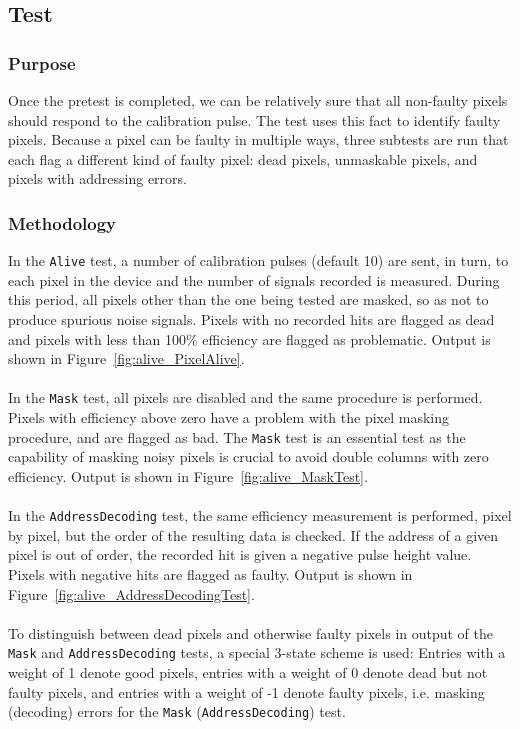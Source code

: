 
\newpage

\subsection{\alivetest Test}
\label{ss:alive}

\subsubsection{Purpose}

Once the pretest is completed, we can be relatively sure that all non-faulty pixels should respond to the calibration pulse.
The \alivetest test uses this fact to identify faulty pixels.
Because a pixel can be faulty in multiple ways, three subtests are run that each flag a different kind of faulty pixel:
dead pixels, unmaskable pixels, and pixels with addressing errors.

\subsubsection{Methodology}

In the {\tt Alive} test, a number of calibration pulses (default 10) are sent, in turn,
to each pixel in the device and the number of signals recorded is measured.
During this period, all pixels other than the one being tested are masked, so as not to produce spurious noise signals.
Pixels with no recorded hits are flagged as dead and pixels with less than 100\% efficiency are flagged as problematic.
Output is shown in Figure~\ref{fig:alive_PixelAlive}.
\\\\
In the {\tt Mask} test, all pixels are disabled and the same procedure is performed.
Pixels with efficiency above zero have a problem with the pixel masking procedure, and are flagged as bad.
The {\tt Mask} test is an essential test as the capability of masking
noisy pixels is crucial to avoid double columns with zero efficiency.
Output is shown in Figure~\ref{fig:alive_MaskTest}.
\\\\
In the {\tt AddressDecoding} test, the same efficiency measurement is performed, pixel by pixel,
but the order of the resulting data is checked.
If the address of a given pixel is out of order, the recorded hit is given a negative pulse height value.
Pixels with negative hits are flagged as faulty.
Output is shown in Figure~\ref{fig:alive_AddressDecodingTest}.
\\\\
To distinguish between dead pixels and otherwise faulty pixels in output of the {\tt Mask} and {\tt AddressDecoding} tests, 
a special 3-state scheme is used:  
Entries with a weight of 1 denote good pixels,
entries with a weight of 0 denote dead but not faulty pixels,
and entries with a weight of -1 denote faulty pixels, i.e. masking (decoding) errors for the {\tt Mask} ({\tt AddressDecoding}) test.

